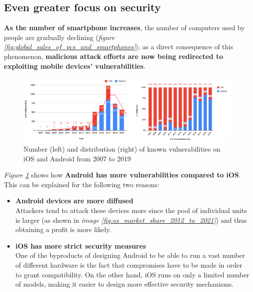 \subsection{Even greater focus on security}
\textbf{As the number of smartphone increases}, the number of computers used by people are gradually declining (\textit{figure \ref{fig:global_sales_of_pcs_and_smartphones}}); as a direct consequence of this phenomenon, \textbf{malicious attack efforts are now being redirected to exploiting mobile devices' vulnerabilities}.
\begin{figure}[H]
    \centering
    \includegraphics[width=\linewidth]{document/chapters/chapter_3/images/mobile_vulnerabilities.jpg}
    \caption{Number (left) and distribution (right) of known vulnerabilities on iOS and Android from 2007 to 2019 \cite{mobile_security}}
    \label{fig:mobile_vulnerabilities}
\end{figure}
\textit{Figure \ref{fig:mobile_vulnerabilities}} shows how \textbf{Android has more vulnerabilities compared to iOS}. This can be explained for the following two reasons:
\begin{itemize}
    \item \textbf{Android devices are more diffused}\\
    Attackers tend to attack these devices more since the pool of individual units is larger (as shown in \textit{image \ref{fig:os_market_share_2012_to_2021}}) and thus obtaining a profit is more likely.
    \item \textbf{iOS has more strict security measures} \cite{mobile_security}\\
    One of the byproducts of designing Android to be able to run a vast number of different hardware is the fact that compromises have to be made in order to grant compatibility. On the other hand, iOS runs on only a limited number of models, making it easier to design more effective security mechanisms. 
\end{itemize}
